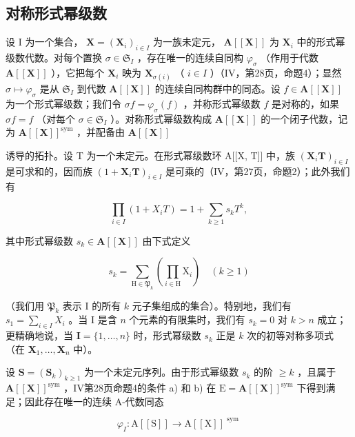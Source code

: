 \subsection{对称形式幂级数}

设 I 为一个集合， \(\mathbf{X} = (\mathbf{X}_i)_{i\in I}\) 为一族未定元， \(\mathbf{A}[[\mathbf{X}]]\) 为 \(\mathbf{X}_i\) 中的形式幂级数代数。对每个置换 \(\sigma \in \mathfrak{S}_I\) ，存在唯一的连续自同构 \(\varphi_{\sigma}\) （作用于代数 \(\mathbf{A}[[\mathbf{X}]]\) ），它把每个 \(\mathbf{X}_i\) 映为 \(\mathbf{X}_{\sigma (i)}\) （ \(i\in I\) ）（IV，第28页，命题4）；显然 \(\sigma \mapsto \varphi_{\sigma}\) 是从 \(\mathfrak{S}_I\) 到代数 \(\mathbf{A}[[\mathbf{X}]]\) 的连续自同构群中的同态。设 \(f\in \mathbf{A}[[\mathbf{X}]]\) 为一个形式幂级数；我们令 \(\sigma f = \varphi_{\sigma}(f)\) ，并称形式幂级数 \(f\) 是对称的，如果 \(\sigma f = f\) （对每个 \(\sigma \in \mathfrak{S}_I\) ）。对称形式幂级数构成 \(\mathbf{A}[[\mathbf{X}]]\) 的一个闭子代数，记为 \(\mathbf{A}[[\mathbf{X}]]^{\mathrm{sym}}\) ，并配备由 \(\mathbf{A}[[\mathbf{X}]]\)

诱导的拓扑。设 T 为一个未定元。在形式幂级数环 A{[}{[}X, T{]}{]} 中，族 \((\mathbf{X}_i\mathbf{T})_{i\in I}\) 是可求和的，因而族 \((1 + \mathbf{X}_i\mathbf{T})_{i\in I}\) 是可乘的（IV，第27页，命题2）；此外我们有

\[
\prod_ {i \in I} (1 + X _ {i} T) = 1 + \sum_ {k \geqslant 1} s _ {k} T ^ {k},\tag{14}
\]

其中形式幂级数 \(s_k \in \mathbf{A}[[\mathbf{X}]]\) 由下式定义

\[
s _ {k} = \sum_ {\mathrm{H} \in \mathfrak {P} _ {k}} \left(\prod_ {i \in \mathrm{H}} \mathrm{X} _ {i}\right) \quad (k \geqslant 1)\tag{15}
\]

（我们用 \(\mathfrak{P}_k\) 表示 I 的所有 \(k\) 元子集组成的集合）。特别地，我们有 \(s_1 = \sum_{i \in I} X_i\) 。当 I 是含 \(n\) 个元素的有限集时，我们有 \(s_k = 0\) 对 \(k > n\) 成立；更精确地说，当 \(\mathbf{I} = \{1,\dots,n\}\) 时，形式幂级数 \(s_k\) 正是 \(k\) 次的初等对称多项式（在 \(\mathbf{X}_1,\ldots,\mathbf{X}_n\) 中）。

设 \(\mathbf{S} = (\mathbf{S}_k)_{k\geqslant 1}\) 为一个未定元序列。由于形式幂级数 \(s_k\) 的阶 \(\geqslant k\) ，且属于 \(\mathbf{A}[[\mathbf{X}]]^{\mathrm{sym}}\) ，IV第28页命题4的条件 a) 和 b) 在 \(\mathrm{E} = \mathbf{A}[[\mathbf{X}]]^{\mathrm{sym}}\) 下得到满足；因此存在唯一的连续 A-代数同态

\[
\varphi_ {I}: \mathrm{A} [ [ \mathrm{S} ] ] \rightarrow \mathrm{A} [ [ \mathrm{X} ] ] ^ {\text { sym }}
\]

